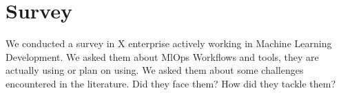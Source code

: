 \section{Survey}\label{sec:stsurvey}
We conducted a survey in X enterprise actively working in Machine Learning Development.
We asked them about MlOps Workflows and tools, they are actually using or plan on using.
We asked them about some challenges encountered in the literature.
Did they face them?
How did they tackle them?
